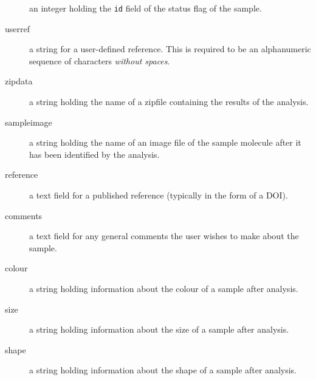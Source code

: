 \documentclass[12pt]{article}
\begin{document}
\begin{description}
an integer holding the \verb=id= field of the status flag of the sample.
\item[userref]
a string for a user-defined reference. This is required to be an
alphanumeric sequence of characters \emph{without spaces}.
\item[zipdata]
a string holding the name of a zipfile containing the results of the analysis.
\item[sampleimage]
a string holding the name of an image file of the sample molecule after it
has been identified by the analysis.
\item[reference]
a text field for a published reference (typically in the form of a DOI).
\item[comments]
a text field for any general comments the user wishes to make about the sample.
\item[colour]
a string holding information about the colour of a sample after analysis.
\item[size]
a string holding information about the size of a sample after analysis.
\item[shape]
a string holding information about the shape of a sample after analysis.
\end{description}
\end{document}
